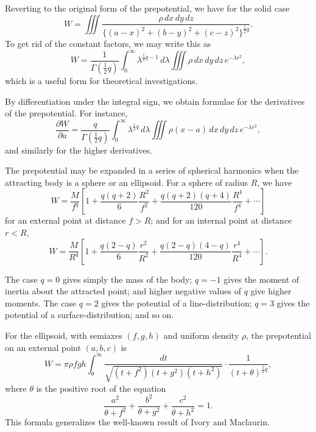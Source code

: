 \documentclass[11pt,a4paper]{book}
\begin{document}
\begin{art}
Reverting to the original form of the prepotential, we have for the solid case
\[
W = \iiint \frac{\rho\,dx\,dy\,dz}{\{(a-x)^2 + (b-y)^2 + (c-z)^2\}^{\frac{1}{2}q}}.
\]
To get rid of the constant factors, we may write this as
\[
W = \frac{1}{\Gamma(\frac{1}{2}q)} \int_0^{\infty} \lambda^{\frac{1}{2}q-1}\,d\lambda \iiint \rho\,dx\,dy\,dz\,e^{-\lambda r^2},
\]
which is a useful form for theoretical investigations.
\end{art}

\begin{art}
By differentiation under the integral sign, we obtain formulae for the derivatives of the prepotential. For instance,
\[
\frac{\partial W}{\partial a} = \frac{q}{\Gamma(\frac{1}{2}q)} \int_0^{\infty} \lambda^{\frac{1}{2}q}\,d\lambda \iiint \rho(x-a)\,dx\,dy\,dz\,e^{-\lambda r^2},
\]
and similarly for the higher derivatives.
\end{art}

\begin{art}
The prepotential may be expanded in a series of spherical harmonics when the attracting body is a sphere or an ellipsoid. For a sphere of radius $R$, we have
\[
W = \frac{M}{f^q}\left[1 + \frac{q(q+2)}{6}\frac{R^2}{f^2} + \frac{q(q+2)(q+4)}{120}\frac{R^4}{f^4} + \cdots\right]
\]
for an external point at distance $f > R$; and for an internal point at distance $r < R$,
\[
W = \frac{M}{R^q}\left[1 + \frac{q(2-q)}{6}\frac{r^2}{R^2} + \frac{q(2-q)(4-q)}{120}\frac{r^4}{R^4} + \cdots\right].
\]
\end{art}

\begin{art}
The case $q = 0$ gives simply the mass of the body; $q = -1$ gives the moment of inertia about the attracted point; and higher negative values of $q$ give higher moments. The case $q = 2$ gives the potential of a line-distribution; $q = 3$ gives the potential of a surface-distribution; and so on.
\end{art}

\begin{art}
For the ellipsoid, with semiaxes $(f, g, h)$ and uniform density $\rho$, the prepotential on an external point $(a, b, c)$ is
\[
W = \pi\rho fgh \int_{\theta}^{\infty} \frac{dt}{\sqrt{(t+f^2)(t+g^2)(t+h^2)}} \cdot \frac{1}{(t + \theta)^{\frac{1}{2}q}},
\]
where $\theta$ is the positive root of the equation
\[
\frac{a^2}{\theta + f^2} + \frac{b^2}{\theta + g^2} + \frac{c^2}{\theta + h^2} = 1.
\]
This formula generalizes the well-known result of Ivory and Maclaurin.
\end{art}
\end{document}
